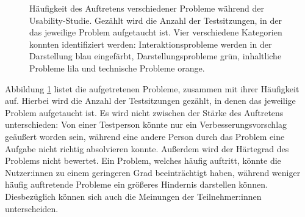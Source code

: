 \begin{figure}[!ht]
  \caption[Häufigkeit des Auftretens verschiedener Usability-Probleme]{Häufigkeit des Auftretens verschiedener Probleme während der Usability-Studie. Gezählt wird die Anzahl der Testsitzungen, in der das jeweilige Problem aufgetaucht ist. Vier verschiedene Kategorien konnten identifiziert werden: Interaktionsprobleme werden in der Darstellung blau eingefärbt, Darstellungsprobleme grün, inhaltliche Probleme lila und technische Probleme orange.}
  \label{fig:problems}
\end{figure}

Abbildung \ref{fig:problems} listet die aufgetretenen Probleme, zusammen mit ihrer Häufigkeit auf. Hierbei wird die Anzahl der Testsitzungen gezählt, in denen das jeweilige Problem aufgetaucht ist. Es wird nicht zwischen der Stärke des Auftretens unterschieden: Von einer Testperson könnte nur ein Verbesserungsvorschlag geäußert worden sein, während eine andere Person durch das Problem eine Aufgabe nicht richtig absolvieren konnte. Außerdem wird der Härtegrad des Problems nicht bewertet. Ein Problem, welches häufig auftritt, könnte die Nutzer:innen zu einem geringeren Grad beeinträchtigt haben, während weniger häufig auftretende Probleme ein größeres Hindernis darstellen können. Diesbezüglich können sich auch die Meinungen der Teilnehmer:innen unterscheiden.

